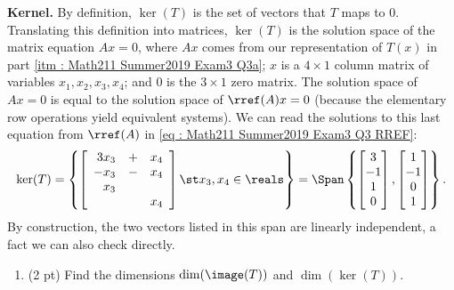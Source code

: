 {\textbf{Kernel.} By definition, $\ker(T)$ is the set of vectors that $T$ maps to $0$. Translating this definition into matrices, $\ker(T)$ is the solution space of the matrix equation $A x = 0$, where $A x$ comes from our representation of $T(x)$ in part \ref{itm : Math211 Summer2019 Exam3 Q3a}; $x$ is a $4 \times 1$ column matrix of variables $x_{1},x_{2},x_{3},x_{4}$; and $0$ is the $3 \times 1$ zero matrix. The solution space of $A x = 0$ is equal to the solution space of $\rref(A) x = 0$ (because the elementary row operations yield equivalent systems). We can read the solutions to this last equation from $\rref(A)$ in \eqref{eq : Math211 Summer2019 Exam3 Q3 RREF}:
\begin{align*}
\ker(T)
=
\left\{
\left[
\begin{array}{r c r}
3 x_{3}	&	+	&	x_{4}	\\
-x_{3}	&	-	&	x_{4}	\\
x_{3}		&		&		\\
		&		&	x_{4}
\end{array}
\right]
\st
x_{3},x_{4} \in \reals
\right\}
=
\Span
\left\{
\begin{bmatrix}
3	\\
-1	\\
1	\\
0
\end{bmatrix}%
,
\begin{bmatrix}
1	\\
-1	\\
0	\\
1
\end{bmatrix}%
\right\}.
\end{align*}
By construction, the two vectors listed in this span are linearly independent, a fact we can also check directly.}%







\begin{enumerate}[resume,label=(\alph*)]
\item\label{itm : Math211 Summer2019 Exam3 Q3c} (2 pt) Find the dimensions $\dim(\image(T))$ and $\dim(\ker(T))$.
\end{enumerate}

